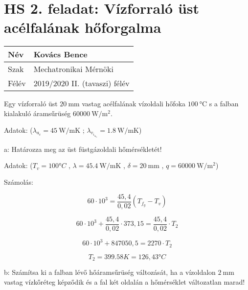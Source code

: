 
\section*{HS 2. feladat: Vízforraló üst acélfalának hőforgalma}

\begin{tabular}{ | p{2cm} | p{14cm} | } 
	\hline
	Név & Kovács Bence \\ 
	\hline
	Szak &  Mechatronikai Mérnöki\\
	\hline
	Félév & 2019/2020 II. (tavaszi) félév \\ 
	\hline
\end{tabular}
\vspace{0.5cm}


Egy vízforraló üst $\SI{20}{\milli\meter}$ vastag acélfalának vízoldali hőfoka $\SI{100}{\celsius}$ s a falban kialakuló áramsűrüség $\SI{60000}{\watt\per\meter^2}$.

\noindent Adatok:    ($\lambda_a_c = \SI{45}{\watt\per\meter\K}$ ;
                     $\lambda_v_i_z_k_o = \SI{1,8}{\watt\per\meter\K}$)
                     
\vspace{1mm}

\vspace{1mm}
\noindent a: Határozza meg az üst füstgázoldali hőmérsékletét!


Adatok:
($ T_v = 100 °C $ , $\lambda = \SI{45.4}{\watt\per\meter\K}$ , $\delta = \SI{20}{\milli\meter}$ ,  $ q = \SI{60000}{\watt\per\meter^2} $)

Számolás:

\begin{equation}
60 \cdot 10^3 = \frac{45,4}{0,02} (T_f_g - T_v)
\end{equation}

\begin{equation}
60 \cdot 10^3 + \frac{45,4}{0,02} \cdot 373,15= \frac{45,4}{0,02} \cdot T_2
\end{equation}

\begin{equation}
60 \cdot 10^3 + 847050,5 = 2270 \cdot T_2
\end{equation}

\begin{equation}
T_2 = 399.58K = 126,43 °C
\end{equation}

\vspace{1mm}
\noindent b: Számítsa ki a falban lévő hőáramsűrüség változását, ha a vízoldalon $\SI{2}{\milli\meter}$ vastag vízkőréteg képződik és a fal két oldalán a hőmérséklet változatlan marad!

